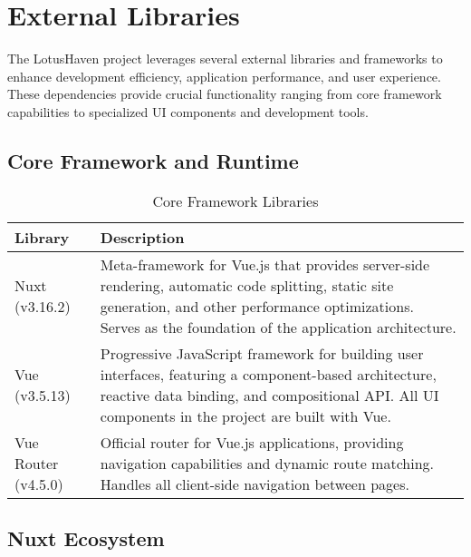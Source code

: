 \section{External Libraries}

The LotusHaven project leverages several external libraries and frameworks to enhance development efficiency, application performance, and user experience. These dependencies provide crucial functionality ranging from core framework capabilities to specialized UI components and development tools.

\subsection{Core Framework and Runtime}

\begin{table}[H]
    \centering
    \setlength{\tabcolsep}{5pt}
    \renewcommand{\arraystretch}{1.2} 
    \begin{tabular}{|p{3.5cm}|p{10.8cm}|}
        \hline
        \rowcolor{bluepoli!20}
        \textbf{Library} & \textbf{Description} \\
        \hline
        Nuxt (v3.16.2) & Meta-framework for Vue.js that provides server-side rendering, automatic code splitting, static site generation, and other performance optimizations. Serves as the foundation of the application architecture. \\
        \hline
        Vue (v3.5.13) & Progressive JavaScript framework for building user interfaces, featuring a component-based architecture, reactive data binding, and compositional API. All UI components in the project are built with Vue. \\
        \hline
        Vue Router (v4.5.0) & Official router for Vue.js applications, providing navigation capabilities and dynamic route matching. Handles all client-side navigation between pages. \\
        \hline
    \end{tabular}
    \caption{Core Framework Libraries}
\end{table}

\subsection{Nuxt Ecosystem}


